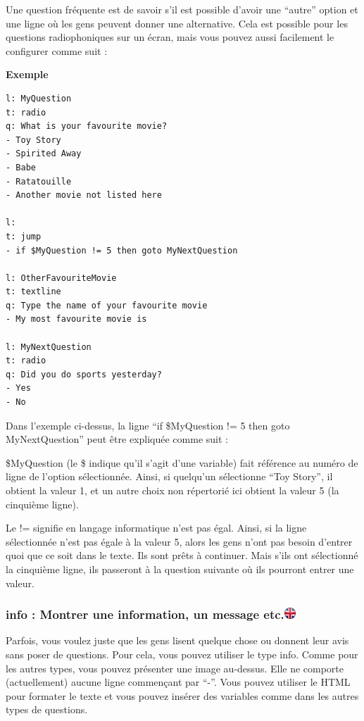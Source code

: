 \documentclass[
]{book}
\begin{document}
Une question fréquente est de savoir s'il est possible d'avoir une
``autre'' option et une ligne où les gens peuvent donner une
alternative. Cela est possible pour les questions radiophoniques sur un
écran, mais vous pouvez aussi facilement le configurer comme suit :

\textbf{Exemple}

\begin{verbatim}
l: MyQuestion
t: radio
q: What is your favourite movie?
- Toy Story
- Spirited Away
- Babe
- Ratatouille
- Another movie not listed here

l:
t: jump
- if $MyQuestion != 5 then goto MyNextQuestion

l: OtherFavouriteMovie
t: textline
q: Type the name of your favourite movie
- My most favourite movie is

l: MyNextQuestion
t: radio
q: Did you do sports yesterday?
- Yes
- No
\end{verbatim}

Dans l'exemple ci-dessus, la ligne ``if \$MyQuestion != 5 then goto
MyNextQuestion'' peut être expliquée comme suit :

\$MyQuestion (le \$ indique qu'il s'agit d'une variable) fait référence
au numéro de ligne de l'option sélectionnée. Ainsi, si quelqu'un
sélectionne ``Toy Story'', il obtient la valeur 1, et un autre choix non
répertorié ici obtient la valeur 5 (la cinquième ligne).

Le != signifie en langage informatique n'est pas égal. Ainsi, si la
ligne sélectionnée n'est pas égale à la valeur 5, alors les gens n'ont
pas besoin d'entrer quoi que ce soit dans le texte. Ils sont prêts à
continuer. Mais s'ils ont sélectionné la cinquième ligne, ils passeront
à la question suivante où ils pourront entrer une valeur.

\hypertarget{info-montrer-une-information-un-message-etc.}{%
\subsubsection[info : Montrer une information, un message
etc.]{\texorpdfstring{info : Montrer une information, un message
etc.\href{https://www.psytoolkit.org/doc3.1.0/online-survey-syntax.html\#info}{\protect\includegraphics{img/ukflag.png}}}{info : Montrer une information, un message etc.}}\label{info-montrer-une-information-un-message-etc.}}

Parfois, vous voulez juste que les gens lisent quelque chose ou donnent
leur avis sans poser de questions. Pour cela, vous pouvez utiliser le
type info. Comme pour les autres types, vous pouvez présenter une image
au-dessus. Elle ne comporte (actuellement) aucune ligne commençant par
``-''. Vous pouvez utiliser le HTML pour formater le texte et vous
pouvez insérer des variables comme dans les autres types de questions.
\end{document}
